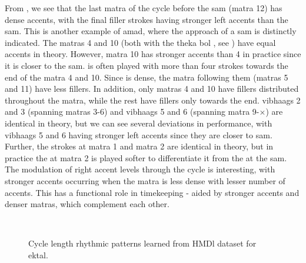 \begin{description}[style=unboxed,leftmargin=0cm]
\item[\textbf{\Gls{vilambit} \gls{ektal}}:] From , we see that the last matra of the cycle before the \gls{sam} (\gls{matra} 12) has dense accents, with the final filler strokes having stronger left accents than the \gls{sam}. This is another example of \gls{amad}, where the approach of a \gls{sam} is distinctly indicated. The \glspl{matra} 4 and 10 (both with the \gls{theka} \gls{bol}    , see ) have equal accents in theory. However, \gls{matra} 10 has stronger accents than 4 in practice since it is closer to the \gls{sam}.     is often played with more than four strokes towards the end of the matra 4 and 10. Since     is dense, the \gls{matra} following them (\glspl{matra} 5 and 11) have less fillers. In addition, only \glspl{matra} 4 and 10 have fillers distributed throughout the \gls{matra}, while the rest have fillers only towards the end. \Glspl{vibhaag} 2 and 3 (spanning \glspl{matra} 3-6) and \glspl{vibhaag} 5 and 6 (spanning \gls{matra} 9-$\times$) are identical in theory, but we can see several deviations in performance, with \glspl{vibhaag} 5 and 6 having stronger left accents since they are closer to \gls{sam}. Further, the strokes  at \gls{matra} 1 and \gls{matra} 2 are identical in theory, but in practice the  at \gls{matra} 2 is played softer to differentiate it from the  at the \gls{sam}. The modulation of right accent levels through the cycle is interesting, with stronger accents occurring when the \gls{matra} is less dense with lesser number of accents. This has a functional role in timekeeping - aided by stronger accents and denser \glspl{matra}, which complement each other. 
\end{description}
%
\begin{figure}[t]
\captionsetup[subfigure]{labelformat=empty}
\centering
{} \\ \vspace{-1.35cm}
\caption[Rhythm patterns in \gls{ektal} learned from \acrshort{HMDl} dataset]{Cycle length rhythmic patterns learned from \acrshort{HMDl} dataset for \gls{ektal}.}\label{fig:tt:HMDl:ek}
\end{figure}
